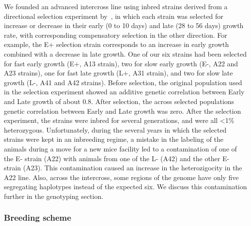 \begin{refsection}
We founded an advanced intercross line using inbred strains derived from a
directional selection experiment by~\textcite{Atchley1997-vn}, in which each
strain was selected for increase or decrease in their early (0 to 10 days) and
late (28 to 56 days) growth rate, with corresponding compensatory selection in
the other direction. For example, the E+ selection strain corresponds to an
increase in early growth combined with a decrease in late growth. One of our
six strains had been selected for fast early growth (E+, A13 strain), two for
slow early growth (E-, A22 and A23 strains), one for fast late growth (L+, A31
strain), and two for slow late growth (L-, A41 and A42 strains). Before
selection, the original population used in the selection experiment showed an
additive genetic correlation between Early and Late growth of about 0.8. After
selection, the across selected populations genetic correlation between Early
and Late growth was zero. After the selection experiment, the strains were
inbred for several generations, and were all <1\% heterozygous. Unfortunately,
during the several years in which the selected strains were kept in an
inbreeding regime, a mistake in the labeling of the animals during a move for
a new mice facility led to a contamination of one of the E- strain (A22) with
animals from one of the L- (A42) and the other E- strain (A23). This
contamination caused an increase in the heterozigocity in the A22 line. Also,
across the intercross, some regions of the genome have only five segregating
haplotypes instead of the expected six. We discuss this contamination further
in the genotyping section.

\subsubsection{Breeding scheme}


\end{refsection}
